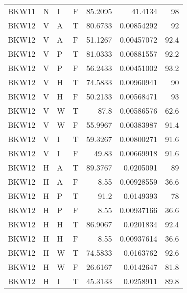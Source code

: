 \begin{longtable}{llllrrr}
    BKW11    & N         & I         & F          & 85.2095    & 41.4134     & 98       \\
    BKW12    & V         & A         & T          & 80.6733    & 0.00854292  & 92       \\
    BKW12    & V         & A         & F          & 51.1267    & 0.00457072  & 92.4     \\
    BKW12    & V         & P         & T          & 81.0333    & 0.00881557  & 92.2     \\
    BKW12    & V         & P         & F          & 56.2433    & 0.00451002  & 93.2     \\
    BKW12    & V         & H         & T          & 74.5833    & 0.00960941  & 90       \\
    BKW12    & V         & H         & F          & 50.2133    & 0.00568471  & 93       \\
    BKW12    & V         & W         & T          & 87.8       & 0.00586576  & 62.6     \\
    BKW12    & V         & W         & F          & 55.9967    & 0.00383987  & 91.4     \\
    BKW12    & V         & I         & T          & 59.3267    & 0.00800271  & 91.6     \\
    BKW12    & V         & I         & F          & 49.83      & 0.00669918  & 91.6     \\
    BKW12    & H         & A         & T          & 89.3767    & 0.0205091   & 89       \\
    BKW12    & H         & A         & F          & 8.55       & 0.00928559  & 36.6     \\
    BKW12    & H         & P         & T          & 91.2       & 0.0149393   & 78       \\
    BKW12    & H         & P         & F          & 8.55       & 0.00937166  & 36.6     \\
    BKW12    & H         & H         & T          & 86.9067    & 0.0201834   & 92.4     \\
    BKW12    & H         & H         & F          & 8.55       & 0.00937614  & 36.6     \\
    BKW12    & H         & W         & T          & 74.5833    & 0.0163762   & 92.6     \\
    BKW12    & H         & W         & F          & 26.6167    & 0.0142647   & 81.8     \\
    BKW12    & H         & I         & T          & 45.3133    & 0.0258911   & 89.8     \\

\end{longtable}
